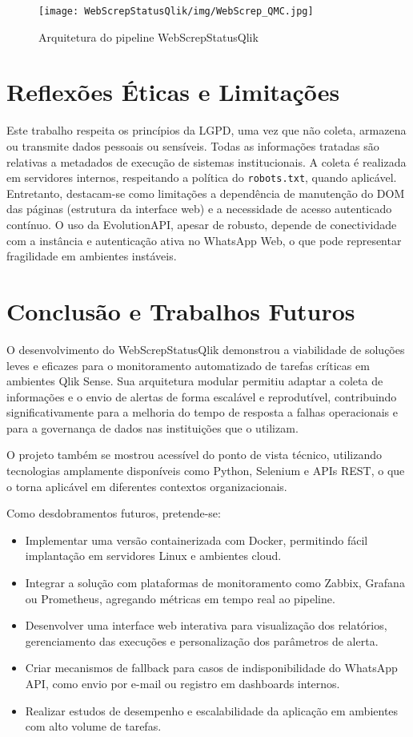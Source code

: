 \documentclass[conference]{IEEEtran}
\begin{document}
\begin{figure}[ht]
\centering
\texttt{[image: WebScrepStatusQlik/img/WebScrep\_QMC.jpg]}
\caption{Arquitetura do pipeline WebScrepStatusQlik}
\end{figure}

\section{Reflexões Éticas e Limitações}

Este trabalho respeita os princípios da LGPD, uma vez que não coleta, armazena ou transmite dados pessoais ou sensíveis. Todas as informações tratadas são relativas a metadados de execução de sistemas institucionais. A coleta é realizada em servidores internos, respeitando a política do \texttt{robots.txt}, quando aplicável. Entretanto, destacam-se como limitações a dependência de manutenção do DOM das páginas (estrutura da interface web) e a necessidade de acesso autenticado contínuo. O uso da EvolutionAPI, apesar de robusto, depende de conectividade com a instância e autenticação ativa no WhatsApp Web, o que pode representar fragilidade em ambientes instáveis.

\section{Conclusão e Trabalhos Futuros}
O desenvolvimento do WebScrepStatusQlik demonstrou a viabilidade de soluções leves e eficazes para o monitoramento automatizado de tarefas críticas em ambientes Qlik Sense. Sua arquitetura modular permitiu adaptar a coleta de informações e o envio de alertas de forma escalável e reprodutível, contribuindo significativamente para a melhoria do tempo de resposta a falhas operacionais e para a governança de dados nas instituições que o utilizam.

O projeto também se mostrou acessível do ponto de vista técnico, utilizando tecnologias amplamente disponíveis como Python, Selenium e APIs REST, o que o torna aplicável em diferentes contextos organizacionais.

Como desdobramentos futuros, pretende-se:
\begin{itemize}
  \item Implementar uma versão containerizada com Docker, permitindo fácil implantação em servidores Linux e ambientes cloud.
  \item Integrar a solução com plataformas de monitoramento como Zabbix, Grafana ou Prometheus, agregando métricas em tempo real ao pipeline.
  \item Desenvolver uma interface web interativa para visualização dos relatórios, gerenciamento das execuções e personalização dos parâmetros de alerta.
  \item Criar mecanismos de fallback para casos de indisponibilidade do WhatsApp API, como envio por e-mail ou registro em dashboards internos.
  \item Realizar estudos de desempenho e escalabilidade da aplicação em ambientes com alto volume de tarefas.
\end{itemize}
\end{document}
